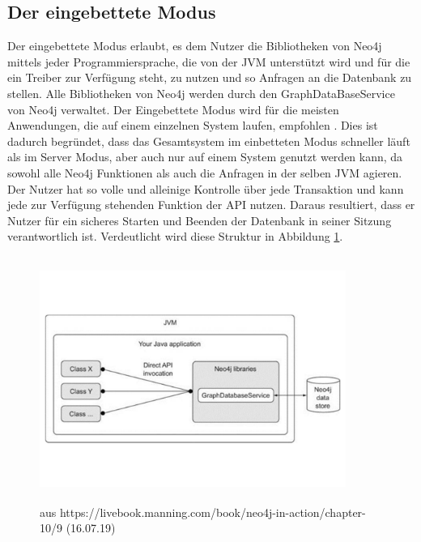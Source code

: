 \subsection{Der eingebettete Modus}
Der eingebettete Modus erlaubt, es dem Nutzer die  Bibliotheken von Neo4j mittels jeder Programmiersprache, die von der JVM unterstützt wird und für die ein Treiber zur Verfügung steht, zu nutzen und so Anfragen an die Datenbank zu stellen. Alle Bibliotheken von Neo4j werden durch den GraphDataBaseService von Neo4j verwaltet. Der Eingebettete Modus wird für die meisten Anwendungen, die auf einem einzelnen System laufen, empfohlen \parencite{raj2015neo4j}. Dies ist dadurch begründet, dass das Gesamtsystem im einbetteten Modus schneller läuft als im Server Modus, aber auch nur auf einem System genutzt werden kann, da sowohl alle Neo4j Funktionen als auch die Anfragen in der selben JVM agieren. Der Nutzer hat so volle und alleinige Kontrolle über jede Transaktion und kann jede zur Verfügung stehenden Funktion der API nutzen. Daraus resultiert, dass er Nutzer für ein sicheres Starten und Beenden der Datenbank in seiner Sitzung verantwortlich ist\parencite{robinson2013graph}.  Verdeutlicht wird diese Struktur in Abbildung \ref{fig:Embedded}.
\begin{figure}[!htb]
	\centering	
	\includegraphics [width=10cm, height=8cm]{Figures/Embedded}
	\caption[Eingebettet]{aus https://livebook.manning.com/book/neo4j-in-action/chapter-10/9 (16.07.19)}
	\label{fig:Embedded}
\end{figure}


